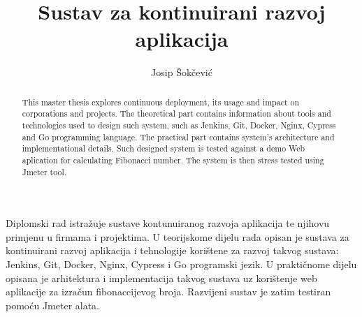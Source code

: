 \documentclass[times, utf8, numeric, diplomski]{ferit}
\begin{document}
\sloppy
\title{Sustav za kontinuirani razvoj aplikacija}

\author{Josip Šokčević}
\maketitle

\tableofcontents














\begin{sazetak}
Diplomski rad istražuje sustave kontunuiranog razvoja aplikacija te njihovu primjenu u firmama i
projektima. U teorijskome dijelu rada opisan je sustava za kontinuirani razvoj aplikacija i
tehnologije korištene za razvoj takvog sustava: Jenkins, Git, Docker, Nginx, Cypress i Go
programski jezik. U praktičnome dijelu opisana je arhitektura i implementacija takvog sustava uz
korištenje web aplikacije za izračun fibonaccijevog broja. Razvijeni sustav je zatim testiran
pomoću Jmeter alata.

\end{sazetak}

\begin{abstract}
This master thesis explores continuous deployment, its usage and impact on corporations and
projects.  The theoretical part contains information about tools and technologies used to design
such system, such as Jenkins, Git, Docker, Nginx, Cypress and Go programming language. The
practical part contains system's architecture and implementational details. Such designed system
is tested against a demo Web aplication for calculating Fibonacci number. The system is then
stress tested using Jmeter tool.

\end{abstract}


\end{document}
